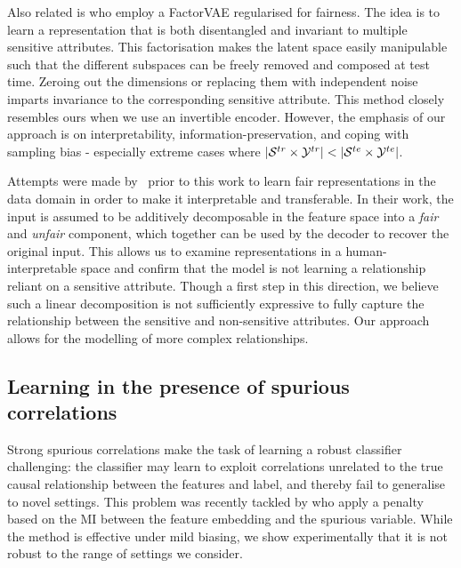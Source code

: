 Also related is \citet{creager2019flexibly} who employ a FactorVAE \citep{kim2018disentangling}
regularised for fairness. 
%
The idea is to learn a representation that is both disentangled and invariant to multiple sensitive
attributes. 
%
This factorisation makes the latent space easily manipulable such that the different subspaces can
be freely removed and composed at test time. Zeroing out the dimensions or replacing them with
independent noise imparts invariance to the corresponding sensitive attribute. 
%
This method closely resembles ours when we use an invertible encoder. 
%
However, the emphasis of our approach is on interpretability, information-preservation, and coping
with sampling bias - especially extreme cases where \( |{\mathcal{S}}^{tr} \times {\mathcal{Y}}^{tr}| < | {\mathcal{S}}^{te}
\times {\mathcal{Y}}^{te} | \).

Attempts were made by~\citet{QuaShaTho19} prior to this work to learn fair representations in the
data domain in order to make it interpretable and transferable. In their work, the input is assumed
to be additively decomposable in the feature space into a \emph{fair} and \emph{unfair} component,
which together can be used by the decoder to recover the original input. This allows us to examine
representations in a human-interpretable space and confirm that the model is not learning a
relationship reliant on a sensitive attribute. Though a first step in this direction, we believe
such a linear decomposition is not sufficiently expressive to fully capture the relationship
between the sensitive and non-sensitive attributes. Our approach allows for the modelling of more
complex relationships.

\subsection{Learning in the presence of spurious correlations}
Strong spurious correlations make the task of learning a robust classifier challenging: the
classifier may learn to exploit correlations unrelated to the true causal relationship between the
features and label, and thereby fail to generalise to novel settings. This problem was recently
tackled by \citet{kim2019learning} who apply a penalty based on the \ac{MI} between the feature
embedding and the spurious variable. While the method is effective under mild biasing, we show
experimentally that it is not robust to the range of settings we consider.

